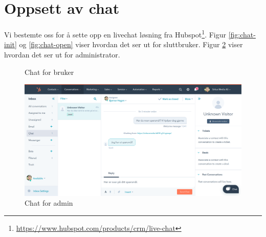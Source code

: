 \section{Oppsett av chat}
Vi bestemte oss for å sette opp en livechat løsning fra Hubspot\footnote{\url{https://www.hubspot.com/products/crm/live-chat}}. Figur \ref{fig:chat-init} og \ref{fig:chat-open} viser hvordan det ser ut for sluttbruker. Figur \ref{fig:chat-admin} viser hvordan det ser ut for administrator.
\begin{figure}[H]
    \begin{center}
        \label{fig:chat-user}
        \caption{Chat for bruker}
    \end{center}
\end{figure}
\begin{figure}[H]
    \centering
    \includegraphics[width=\textwidth]{bjornar/chat-admin.png}
    \caption{Chat for admin}
    \label{fig:chat-admin}
\end{figure}


